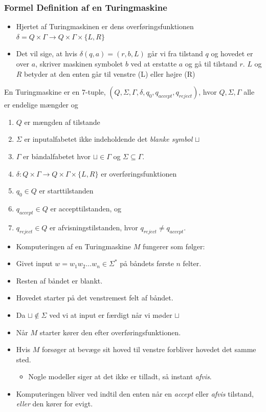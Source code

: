 \begin{frame}[allowframebreaks]
  \frametitle{Formel Definition af en Turingmaskine}
\begin{itemize}
  \item Hjertet af Turingmaskinen er dens overføringsfunktionen $\delta = Q \times \Gamma \longrightarrow Q \times \Gamma  \times \{L,R\}$
  \item Det vil sige, at hvis $\delta(q,a) = (r,b,L)$ går vi fra tilstand $q$ og hovedet er over $a$, skriver maskinen symbolet $b$ ved at erstatte $a$ og gå til tilstand $r$. $L$ og $R$ betyder at den enten går til venstre (L) eller højre (R)
\end{itemize}

\begin{definition}
  En Turingmaskine er en 7-tuple, $(Q, \Sigma, \Gamma, \delta, q_{0}, q_{accept}, q_{reject})$, hvor $Q, \Sigma, \Gamma$ alle er endelige mængder og
  \begin{enumerate}
    \item $Q$ er mængden af tilstande
    \item $\Sigma$ er inputalfabetet ikke indeholdende det \textit{blanke symbol} $\sqcup$
    \item $\Gamma$ er båndalfabetet hvor $\sqcup \in \Gamma$ og $\Sigma \subseteq \Gamma$.
    \item $\delta : Q \times \Gamma \longrightarrow Q \times \Gamma \times \{L,R\}$ er overføringsfunktionen
    \item $q_{0} \in Q$ er starttilstanden
    \item $q_{accept} \in Q$ er accepttilstanden, og
    \item $q_{reject} \in Q$ er afvisningstilstanden, hvor $q_{reject} \ne q_{accept}$.
  \end{enumerate}
\end{definition}

\begin{itemize}
  \item Komputeringen af en Turingmaskine $M$ fungerer som følger:
  \item Givet input $w = w_{1}w_{2} \ldots w_{n} \in \Sigma^{*}$ på båndets første $n$ felter.
  \item Resten af båndet er blankt.
  \item Hovedet starter på det venstremest felt af båndet.
  \item Da $\sqcup \notin \Sigma$ ved vi at input er færdigt når vi møder $\sqcup$
  \item Når $M$ starter kører den efter overføringsfunktionen.
  \item Hvis $M$ forsøger at bevæge sit hoved til venstre forbliver hovedet det samme sted.
        \begin{itemize}
          \item Nogle modeller siger at det ikke er tilladt, så instant \textit{afvis}.
        \end{itemize}
  \item Komputeringen bliver ved indtil den enten når en \textit{accept} eller \textit{afvis} tilstand, \textit{eller} den kører for evigt.
\end{itemize}
\end{frame}

